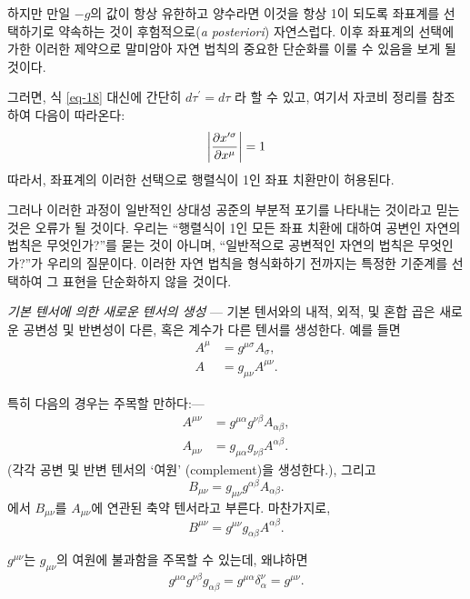\documentclass[b5paper]{article}
\begin{document}
하지만 만일 $-g$의 값이 항상 유한하고 양수라면 이것을 항상 1이 되도록 좌표계를 선택하기로 약속하는 것이 후험적으로(\emph{a posteriori}) 자연스럽다. 이후 좌표계의 선택에 가한 이러한 제약으로 말미암아 자연 법칙의 중요한 단순화를 이룰 수 있음을 보게 될 것이다.

그러면, 식 \eqref{eq-18} 대신에 간단히 $d\tau^\prime = d\tau$ 라 할 수 있고, 여기서 자코비 정리를 참조하여 다음이 따라온다:
\begin{equation} \label{eq-19}
\left|{\frac{{\partial}{x^{\prime\sigma}}}{{\partial}{x^\mu}}}\right|=1
\end{equation}  
따라서, 좌표계의 이러한 선택으로 행렬식이 1인 좌표 치환만이 허용된다.

그러나 이러한 과정이 일반적인 상대성 공준의 부분적 포기를 나타내는 것이라고 믿는 것은 오류가 될 것이다. 우리는 ``행렬식이 1인 모든 좌표 치환에 대하여 공변인 자연의 법칙은 무엇인가?''를 묻는 것이 아니며, ``일반적으로 공변적인 자연의 법칙은 무엇인가?''가 우리의 질문이다. 이러한 자연 법칙을 형식화하기 전까지는 특정한 기준계를 선택하여 그 표현을 단순화하지 않을 것이다. 

\emph{기본 텐서에 의한 새로운 텐서의 생성} ---
기본 텐서와의 내적, 외적, 및 혼합 곱은 새로운 공변성 및 반변성이 다른, 혹은 계수가 다른 텐서를 생성한다. 예를 들면
\begin{align*}
	A^\mu &= g^{\mu\sigma} A_\sigma, \\
	A &= g_{\mu\nu} A^{\mu\nu}.
\end{align*}

특히 다음의 경우는 주목할 만하다:---
\begin{align*}
A^{\mu\nu} &= g^{\mu\alpha} g^{\nu\beta} A_{\alpha\beta}, \\
A_{\mu\nu} &= g_{\mu\alpha} g_{\nu\beta} A^{\alpha\beta}.
\end{align*}
(각각 공변 및 반변 텐서의 `여원' (complement)을 생성한다.), 그리고
\begin{equation*}
	B_{\mu\nu} = g_{\mu\nu} g^{\alpha\beta} A_{\alpha\beta}.
\end{equation*}
에서 $B_{\mu\nu}$를 $A_{\mu\nu}$에 연관된 축약 텐서라고 부른다. 마찬가지로,
\begin{equation*}
	B^{\mu\nu} = g^{\mu\nu} g_{\alpha\beta} A^{\alpha\beta}.
\end{equation*}

$g^{\mu\nu}$는 $g_{\mu\nu}$의 여원에 불과함을 주목할 수 있는데, 왜냐하면
\begin{equation*}
	g^{\mu\alpha} g^{\nu\beta} g_{\alpha\beta}=g^{\mu\alpha}\delta_\alpha^\nu = g^{\mu\nu}.
\end{equation*}
\end{document}
